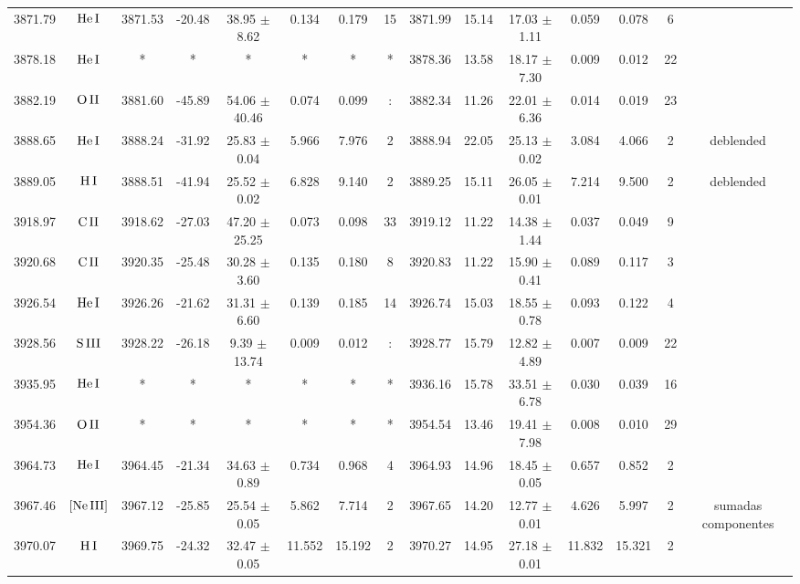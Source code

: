 \documentclass{article}
\begin{document}
\begin{table*}
\begin{adjustbox}{width=\textwidth}
\begin{tabular}{ccccccccccccccc}
3871.79 & $\mbox{He}\thinspace \mbox{I}$ & 3871.53 & -20.48 & 38.95 $\pm$ 8.62 & 0.134 & 0.179 & 15 & 3871.99 & 15.14 & 17.03 $\pm$ 1.11 & 0.059 & 0.078 & 6 &  \\
3878.18 & $\mbox{He}\thinspace \mbox{I}$ & * & * & * & * & * & * & 3878.36 & 13.58 & 18.17 $\pm$ 7.30 & 0.009 & 0.012 & 22 &  \\
3882.19 & $\mbox{O}\thinspace \mbox{II}$ & 3881.60 & -45.89 & 54.06 $\pm$ 40.46 & 0.074 & 0.099 & : & 3882.34 & 11.26 & 22.01 $\pm$ 6.36 & 0.014 & 0.019 & 23 &  \\
3888.65 & $\mbox{He}\thinspace \mbox{I}$ & 3888.24 & -31.92 & 25.83 $\pm$ 0.04 & 5.966 & 7.976 & 2 & 3888.94 & 22.05 & 25.13 $\pm$ 0.02 & 3.084 & 4.066 & 2 &  deblended \\
3889.05 & $\mbox{H}\thinspace \mbox{I}$ & 3888.51 & -41.94 & 25.52 $\pm$ 0.02 & 6.828 & 9.140 & 2 & 3889.25 & 15.11 & 26.05 $\pm$ 0.01 & 7.214 & 9.500 & 2 &  deblended \\
3918.97 & $\mbox{C}\thinspace \mbox{II}$ & 3918.62 & -27.03 & 47.20 $\pm$ 25.25 & 0.073 & 0.098 & 33 & 3919.12 & 11.22 & 14.38 $\pm$ 1.44 & 0.037 & 0.049 & 9 &  \\
3920.68 & $\mbox{C}\thinspace \mbox{II}$ & 3920.35 & -25.48 & 30.28 $\pm$ 3.60 & 0.135 & 0.180 & 8 & 3920.83 & 11.22 & 15.90 $\pm$ 0.41 & 0.089 & 0.117 & 3 &  \\
3926.54 & $\mbox{He}\thinspace \mbox{I}$ & 3926.26 & -21.62 & 31.31 $\pm$ 6.60 & 0.139 & 0.185 & 14 & 3926.74 & 15.03 & 18.55 $\pm$ 0.78 & 0.093 & 0.122 & 4 &  \\
3928.56 & $\mbox{S}\thinspace \mbox{III}$ & 3928.22 & -26.18 & 9.39 $\pm$ 13.74 & 0.009 & 0.012 & : & 3928.77 & 15.79 & 12.82 $\pm$ 4.89 & 0.007 & 0.009 & 22 &  \\
3935.95 & $\mbox{He}\thinspace \mbox{I}$ & * & * & * & * & * & * & 3936.16 & 15.78 & 33.51 $\pm$ 6.78 & 0.030 & 0.039 & 16 &  \\
3954.36 & $\mbox{O}\thinspace \mbox{II}$ & * & * & * & * & * & * & 3954.54 & 13.46 & 19.41 $\pm$ 7.98 & 0.008 & 0.010 & 29 &  \\
3964.73 & $\mbox{He}\thinspace \mbox{I}$ & 3964.45 & -21.34 & 34.63 $\pm$ 0.89 & 0.734 & 0.968 & 4 & 3964.93 & 14.96 & 18.45 $\pm$ 0.05 & 0.657 & 0.852 & 2 &  \\
3967.46 & $\mbox{[Ne}\thinspace \mbox{III]}$ & 3967.12 & -25.85 & 25.54 $\pm$ 0.05 & 5.862 & 7.714 & 2 & 3967.65 & 14.20 & 12.77 $\pm$ 0.01 & 4.626 & 5.997 & 2 &  sumadas componentes \\
3970.07 & $\mbox{H}\thinspace \mbox{I}$ & 3969.75 & -24.32 & 32.47 $\pm$ 0.05 & 11.552 & 15.192 & 2 & 3970.27 & 14.95 & 27.18 $\pm$ 0.01 & 11.832 & 15.321 & 2 &  \\

\end{tabular}
\end{adjustbox}
\end{table*}
\end{document}
